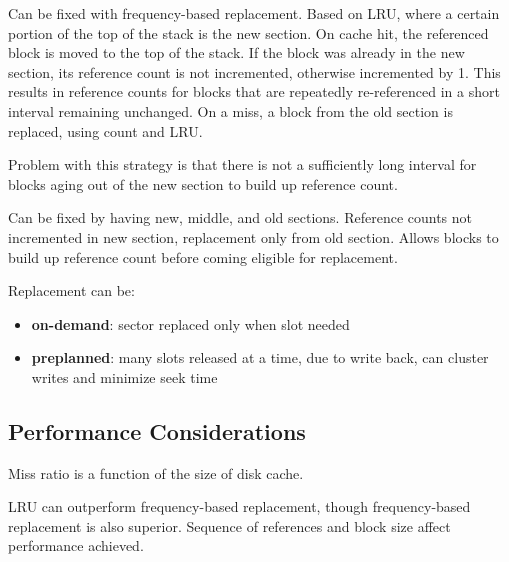 \documentclass[11pt]{article}
\begin{document}
Can be fixed with frequency-based replacement.
Based on LRU, where a certain portion of the top of the stack is the new section.
On cache hit, the referenced block is moved to the top of the stack.
If the block was already in the new section, its reference count is not
incremented, otherwise incremented by 1.
This results in reference counts for blocks that are repeatedly re-referenced
in a short interval remaining unchanged.
On a miss, a block from the old section is replaced, using count and LRU.

Problem with this strategy is that there is not a sufficiently long interval for
blocks aging out of the new section to build up reference count.

Can be fixed by having new, middle, and old sections.
Reference counts not incremented in new section, replacement only from old section.
Allows blocks to build up reference count before coming eligible for replacement.

Replacement can be:
\begin{itemize}
\item \textbf{on-demand}: sector replaced only when slot needed
\item \textbf{preplanned}: many slots released at a time, due to write back, can cluster writes
and minimize seek time
\end{itemize}
\subsection{Performance Considerations}
\label{sec:orgadb6c2f}
Miss ratio is a function of the size of disk cache.

LRU can outperform frequency-based replacement, though frequency-based replacement is
also superior.
Sequence of references and block size affect performance achieved.
\end{document}
